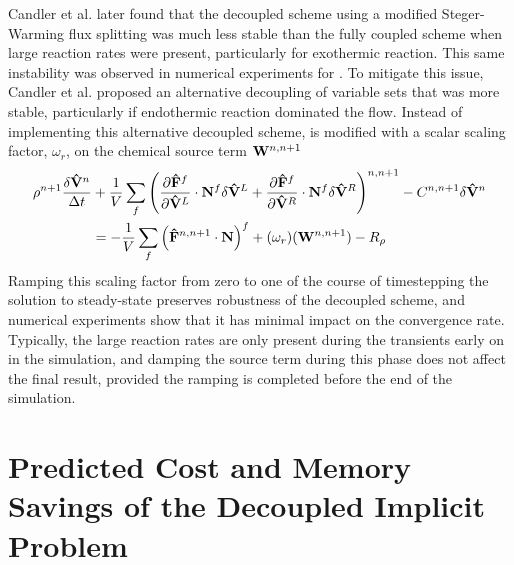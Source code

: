 Candler et al.\cite{candler2013analysis} later found that the decoupled scheme
using a modified Steger-Warming flux splitting was much less stable than the
fully coupled scheme when large reaction rates were present, particularly for
exothermic reaction.  This same instability was observed in numerical
experiments for .  To mitigate this issue, Candler et
al. proposed an alternative decoupling of variable sets that was more stable,
particularly if endothermic reaction dominated the flow.  Instead of
implementing this alternative decoupled scheme,  is
modified with a scalar scaling factor, $\omega_r$, on the chemical source term
$\mathbf W^{n,n+1}$
\begin{equation} 
  \begin{split}
    \rho^{n+1} \frac{\delta \mathbf{\hat{V}}^n}{\Delta t}
    &+\frac{1}{V}
    \sum\limits_{f}^{}{
     \left(
       \frac{\partial \mathbf{\hat{F}}^f}{\partial \mathbf{\hat{V}}^L} \cdot \mathbf{N}^f \delta \mathbf{\hat{V}}^L
       + \frac{\partial \mathbf{\hat{F}}^f}{\partial \mathbf{\hat{V}}^R} \cdot \mathbf{N}^f \delta \mathbf{\hat{V}}^R
      \right)^{n,n+1}}
     - C^{n,n+1} \delta \mathbf{\hat{V}}^n \\
    &= 
    -\frac{1}{V}\sum\limits_{f}^{}{
      \left( \mathbf{\hat{F}}^{n,n+1} \cdot \mathbf{N} \right)^f
    } + (\omega_r) (\mathbf W^{n,n+1}) - R_\rho
  \end{split}
  \label{decoupled-with-scaling}
\end{equation}
Ramping this scaling factor from zero to one of the course of
timestepping the solution to steady-state preserves robustness of the decoupled
scheme, and numerical experiments show that it has minimal impact on the
convergence rate.  Typically, the large reaction rates are only present during
the transients early on in the simulation, and damping the source term during
this phase does not affect the final result, provided the ramping is completed
before the end of the simulation.

\section{Predicted Cost and Memory Savings of the Decoupled Implicit Problem}
\label{sec:predicted-cost-mem-savings}

